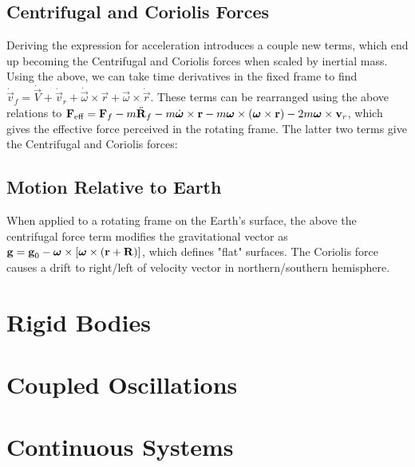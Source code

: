 \subsection{Centrifugal and Coriolis Forces}
Deriving the expression for acceleration introduces a couple new terms, which end up becoming the Centrifugal and Coriolis forces when scaled by inertial mass.  Using the above, we can take time derivatives in the fixed frame to find $\dot{\vec{v}}_f = \dot{\vec{V}} + \dot{\vec{v}}_r + \dot{\vec{\omega}}\times\vec{r} + \vec{\omega}\times\dot{\vec{r}}$. These terms can be rearranged using the above relations to $\boldsymbol{\mathbf{F}}_{\text{eff}} = \boldsymbol{\mathbf{F}}_f - m\ddot{\boldsymbol{\mathbf{R}}}_f - m\dot{\boldsymbol{\mathbf{\omega}}}\times\boldsymbol{\mathbf{r}} - m\boldsymbol{\mathbf{\omega}}\times\left(\boldsymbol{\mathbf{\omega}}\times\boldsymbol{\mathbf{r}}\right) - 2m\boldsymbol{\mathbf{\omega}}\times\boldsymbol{\mathbf{v}}_r$, which gives the effective force perceived in the rotating frame. The latter two terms give the Centrifugal and Coriolis forces:
\subsection{Motion Relative to Earth}
When applied to a rotating frame on the Earth's surface, the above the centrifugal force term modifies the gravitational vector as $\boldsymbol{\mathbf{g}} = \boldsymbol{\mathbf{g}}_0 - \boldsymbol{\mathbf{\omega}}\times\left[\boldsymbol{\mathbf{\omega}}\times\left(\boldsymbol{\mathbf{r}}+\boldsymbol{\mathbf{R}}\right)\right]$, which defines "flat" surfaces. The Coriolis force causes a drift to right/left of velocity vector in northern/southern hemisphere.



\newpage
\section{Rigid Bodies}
\label{sec:cm-rigid}




\newpage
\section{Coupled Oscillations}
\label{sec:cm-coupled}

 


\newpage
\section{Continuous Systems}
\label{sec:cm-continuous}




